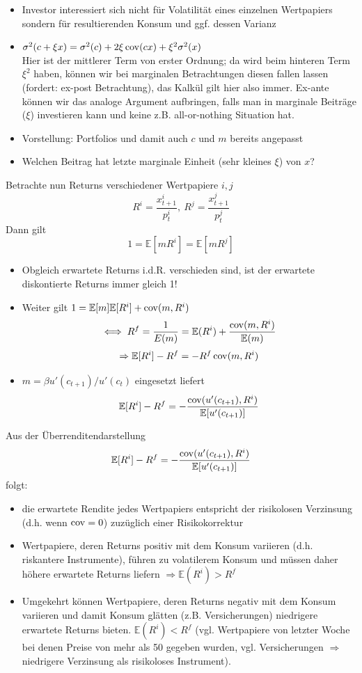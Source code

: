 \documentclass[12pt]{extreport} %
\theoremstyle{named}
\theoremstyle{nnamed}
\theoremstyle{itshape}
\theoremstyle{normal}
\begin{document}
\begin{itemize}
	\item Investor interessiert sich nicht für Volatilität eines einzelnen Wertpapiers sondern für resultierenden Konsum und ggf. dessen Varianz
	\item $\sigma^2(c + \xi x) = \sigma^2(c) + 2 \xi \operatorname{cov} (c x) + \xi^2 \sigma^2(x)$ ~\\
		Hier ist der mittlerer Term von erster Ordnung; da wird beim hinteren Term $\xi^2$ haben, können wir bei marginalen Betrachtungen diesen fallen lassen (fordert: ex-post Betrachtung), das Kalkül gilt hier also immer. Ex-ante können wir das analoge Argument aufbringen, falls man in marginale Beiträge ($\xi$) investieren kann und keine z.B. all-or-nothing Situation hat.
	\item Vorstellung: Portfolios und damit auch $c$ und $m$ bereits angepasst
	\item Welchen Beitrag hat letzte marginale Einheit (sehr kleines $\xi$) von $x$?
\end{itemize}

Betrachte nun Returns verschiedener Wertpapiere $i, j$
	$$ R^i = \frac{x_{t+1}^i}{p_t^i}, ~R^j = \frac{x_{t+1}^j}{p_t^j} $$
Dann gilt
$$ 1= \mathbb{E} \left[ m R^i \right] = \mathbb{E} \left[ m R^j \right] $$
\begin{itemize}
	\item Obgleich erwartete Returns i.d.R. verschieden sind, ist der erwartete diskontierte Returns immer gleich 1!
	\item Weiter gilt $1 = \mathbb{E}[m] \mathbb{E}[R^i] + \operatorname{cov}(m, R^i)$
		$$ \iff R^f = \frac{1}{E(m)} = \mathbb{E}(R^i) + \frac{\operatorname{cov}(m, R^i)}{\mathbb{E}(m)} $$
		$$ \Rightarrow \mathbb{E}[R^i] - R^f = - R^f \operatorname{cov}(m,R^i) $$ %
	\item $m = \beta u'(c_{t+1}) /u'(c_t)$ eingesetzt liefert
		$$ \mathbb{E}[R^i] - R^f = -\frac{\operatorname{cov}(u'(c_{t+1}), R^i)}{\mathbb{E}[u'(c_{t+1})]} $$
\end{itemize}

Aus der Überrenditendarstellung
		$$ \mathbb{E}[R^i] - R^f = -\frac{\operatorname{cov}(u'(c_{t+1}), R^i)}{\mathbb{E}[u'(c_{t+1})]} $$
folgt:
\begin{itemize}
	\item die erwartete Rendite jedes Wertpapiers entspricht der risikolosen Verzinsung (d.h. wenn $\operatorname{cov} = 0$) zuzüglich einer Risikokorrektur
	\item Wertpapiere, deren Returns positiv mit dem Konsum variieren (d.h. riskantere Instrumente), führen zu volatilerem Konsum und müssen daher höhere erwartete Returns liefern $\Rightarrow \mathbb{E}(R^i) > R^f$
	\item Umgekehrt können Wertpapiere, deren Returns negativ mit dem Konsum variieren und damit Konsum glätten (z.B. Versicherungen) niedrigere erwartete Returns bieten. $\mathbb{E}(R^i) < R^f$ (vgl. Wertpapiere von letzter Woche bei denen Preise von mehr als 50 gegeben wurden, vgl. Versicherungen $\Rightarrow$ niedrigere Verzinsung als risikoloses Instrument).
\end{itemize}
\end{document}
